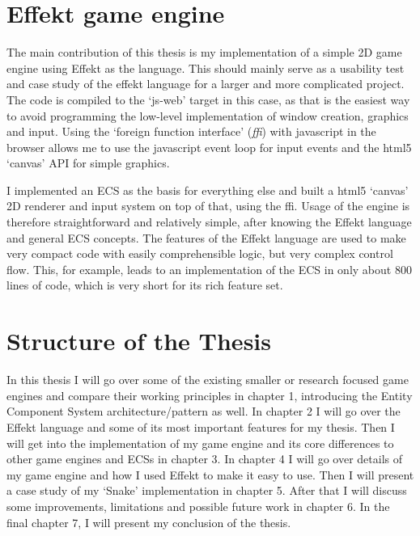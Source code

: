 \section{Effekt game engine}

The main contribution of this thesis is my implementation of a simple 2D game engine using Effekt as the language. This should mainly serve as a usability test and case study of the effekt language for a larger and more complicated project. The code is compiled to the `js-web' target in this case, as that is the easiest way to avoid programming the low-level implementation of window creation, graphics and input. Using the `foreign function interface' (\textit{ffi}) with javascript in the browser allows me to use the javascript event loop for input events and the html5 `canvas' API for simple graphics.

I implemented an ECS as the basis for everything else and built a html5 `canvas' 2D renderer and input system on top of that, using the ffi. Usage of the engine is therefore straightforward and relatively simple, after knowing the Effekt language and general ECS concepts. The features of the Effekt language are used to make very compact code with easily comprehensible logic, but very complex control flow. This, for example, leads to an implementation of the ECS in only about 800 lines of code, which is very short for its rich feature set.

\section{Structure of the Thesis}

In this thesis I will go over some of the existing smaller or research focused game engines and compare their working principles in chapter 1, introducing the Entity Component System architecture/pattern as well. In chapter 2 I will go over the Effekt language and some of its most important features for my thesis. Then I will get into the implementation of my game engine and its core differences to other game engines and ECSs in chapter 3. In chapter 4 I will go over details of my game engine and how I used Effekt to make it easy to use. Then I will present a case study of my `Snake' implementation in chapter 5. After that I will discuss some improvements, limitations and possible future work in chapter 6. In the final chapter 7, I will present my conclusion of the thesis.
